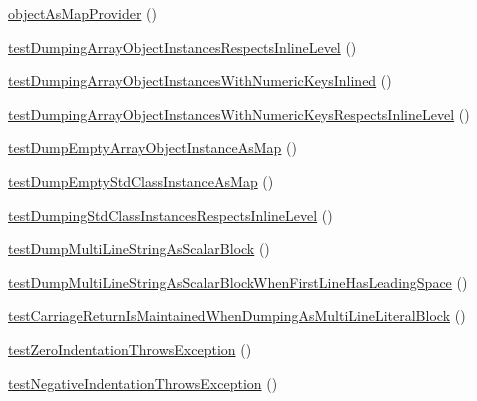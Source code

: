 \begin{DoxyCompactItemize}
\mbox{\hyperlink{class_symfony_1_1_component_1_1_yaml_1_1_tests_1_1_dumper_test_a92be12273ef62efe74dc4ebbeb2db5bd}{object\+As\+Map\+Provider}} ()
\item 
\mbox{\hyperlink{class_symfony_1_1_component_1_1_yaml_1_1_tests_1_1_dumper_test_ae69aa845092339356efafa710bd6195d}{test\+Dumping\+Array\+Object\+Instances\+Respects\+Inline\+Level}} ()
\item 
\mbox{\hyperlink{class_symfony_1_1_component_1_1_yaml_1_1_tests_1_1_dumper_test_a5bf740464d6413cbbc843b2ab7e66214}{test\+Dumping\+Array\+Object\+Instances\+With\+Numeric\+Keys\+Inlined}} ()
\item 
\mbox{\hyperlink{class_symfony_1_1_component_1_1_yaml_1_1_tests_1_1_dumper_test_a79428af1a14067ebcd589a4cba39e914}{test\+Dumping\+Array\+Object\+Instances\+With\+Numeric\+Keys\+Respects\+Inline\+Level}} ()
\item 
\mbox{\hyperlink{class_symfony_1_1_component_1_1_yaml_1_1_tests_1_1_dumper_test_a0f3837a4568c8289ed5221267f67b4ce}{test\+Dump\+Empty\+Array\+Object\+Instance\+As\+Map}} ()
\item 
\mbox{\hyperlink{class_symfony_1_1_component_1_1_yaml_1_1_tests_1_1_dumper_test_a2f0b53fa90ab2c2a57aae7103294c658}{test\+Dump\+Empty\+Std\+Class\+Instance\+As\+Map}} ()
\item 
\mbox{\hyperlink{class_symfony_1_1_component_1_1_yaml_1_1_tests_1_1_dumper_test_adf05cfbaa5e9fd6b73b4215085494fa8}{test\+Dumping\+Std\+Class\+Instances\+Respects\+Inline\+Level}} ()
\item 
\mbox{\hyperlink{class_symfony_1_1_component_1_1_yaml_1_1_tests_1_1_dumper_test_a842bb1923c7e1e4fadc1dfebad59bfc1}{test\+Dump\+Multi\+Line\+String\+As\+Scalar\+Block}} ()
\item 
\mbox{\hyperlink{class_symfony_1_1_component_1_1_yaml_1_1_tests_1_1_dumper_test_aa4685bab062022241ddc36a0a30a2e7f}{test\+Dump\+Multi\+Line\+String\+As\+Scalar\+Block\+When\+First\+Line\+Has\+Leading\+Space}} ()
\item 
\mbox{\hyperlink{class_symfony_1_1_component_1_1_yaml_1_1_tests_1_1_dumper_test_a9954ccfc1594fa9e24ceb16d0e7e27c6}{test\+Carriage\+Return\+Is\+Maintained\+When\+Dumping\+As\+Multi\+Line\+Literal\+Block}} ()
\item 
\mbox{\hyperlink{class_symfony_1_1_component_1_1_yaml_1_1_tests_1_1_dumper_test_abd2a07951f38494a1fe3e2374ffd04de}{test\+Zero\+Indentation\+Throws\+Exception}} ()
\item 
\mbox{\hyperlink{class_symfony_1_1_component_1_1_yaml_1_1_tests_1_1_dumper_test_a463ecf8da1932cf4ca8e02b4d0bf8a66}{test\+Negative\+Indentation\+Throws\+Exception}} ()
\end{DoxyCompactItemize}
